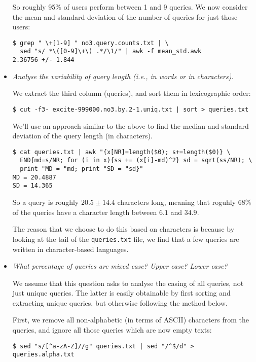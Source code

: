 \begin{itemize}
So roughly 95\% of users perform between 1 and 9 queries. We now consider
the mean and standard deviation of the number of queries for just those users:

\begin{lstlisting}
$ grep " \+[1-9] " no3.query.counts.txt | \
  sed "s/ *\([0-9]\+\) .*/\1/" | awk -f mean_std.awk
2.36756 +/- 1.844
\end{lstlisting}

\item \emph{Analyse the variability of query length (i.e., in words or in
characters).}

We extract the third column (queries), and sort them in lexicographic order:

\begin{lstlisting}
$ cut -f3- excite-999000.no3.by.2-1.uniq.txt | sort > queries.txt
\end{lstlisting}

We'll use an approach similar to the above to find the median and standard
deviation of the query length (in characters).

\begin{lstlisting}
$ cat queries.txt | awk "{x[NR]=length($0); s+=length($0)} \
  END{md=s/NR; for (i in x){ss += (x[i]-md)^2} sd = sqrt(ss/NR); \
  print "MD = "md; print "SD = "sd}"
MD = 20.4887
SD = 14.365
\end{lstlisting}

So a query is roughly $20.5\pm 14.4$ characters long, meaning that roguhly 68\%
of the queries have a character length between $6.1$ and $34.9$.

The reason that we choose to do this based on characters is because by looking
at the tail of the \texttt{queries.txt} file, we find that a few queries are
written in character-based languages. 

\item \emph{What percentage of queries are mixed case? Upper case? Lower case?}

We assume that this question asks to analyse the casing of all queries, not
just unique queries. The latter is easily obtainable by first sorting and
extracting unique queries, but otherwise following the method below.

First, we remove all non-alphabetic (in terms of ASCII) characters from the
queries, and ignore all those queries which are now empty texts:

\begin{lstlisting}
$ sed "s/[^a-zA-Z]//g" queries.txt | sed "/^$/d" > queries.alpha.txt
\end{lstlisting}


\end{itemize}
